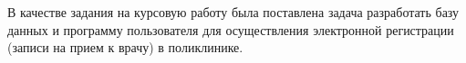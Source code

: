 В качестве задания на курсовую работу была поставлена задача разработать базу данных и программу пользователя для осуществления электронной регистрации (записи на прием к врачу) в поликлинике.  

